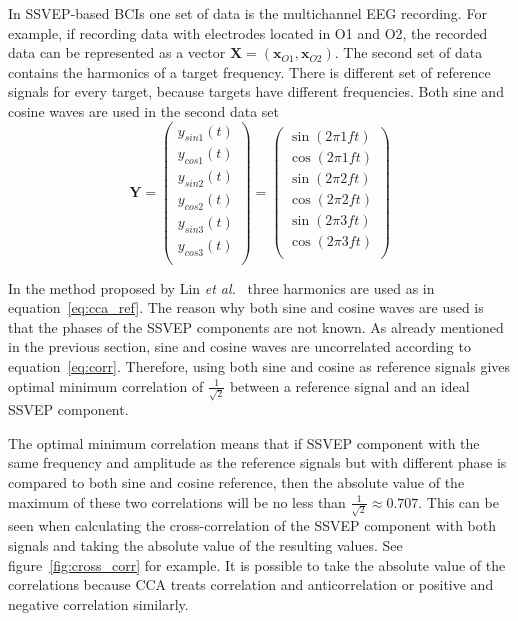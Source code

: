 In \gls{SSVEP}-based \glspl{BCI} one set of data is the multichannel \gls{EEG} recording. For example, if recording data with electrodes located in O1 and O2, the recorded data can be represented as a vector $\mathbf{X}=(\mathbf{x}_{O1}, \mathbf{x}_{O2})$. The second set of data contains the \glspl{harmonic} of a \gls{target} frequency. There is different set of reference signals for every \gls{target}, because \glspl{target} have different frequencies. Both sine and cosine waves are used in the second data set
\begin{equation}
	\label{eq:cca_ref}
	\mathbf{Y}=\begin{pmatrix}
		y_{sin1}(t)\\
		y_{cos1}(t)\\
		y_{sin2}(t)\\
		y_{cos2}(t)\\
		y_{sin3}(t)\\
		y_{cos3}(t)\\
	\end{pmatrix}=\begin{pmatrix}
		\sin(2\pi 1ft)\\
		\cos(2\pi 1ft)\\
		\sin(2\pi 2ft)\\
		\cos(2\pi 2ft)\\
		\sin(2\pi 3ft)\\
		\cos(2\pi 3ft)\\
	\end{pmatrix}
\end{equation}

In the method proposed by Lin \textit{et al.}~\cite{cca_lin} three harmonics are used as in equation~\ref{eq:cca_ref}. The reason why both sine and cosine waves are used is that the phases of the \gls{SSVEP} components are not known. As already mentioned in the previous section, sine and cosine waves are uncorrelated according to equation~\ref{eq:corr}. Therefore, using both sine and cosine as reference signals gives optimal minimum correlation of $\frac{1}{\sqrt{2}}$ between a reference signal and an ideal \gls{SSVEP} component.

The optimal minimum correlation means that if \gls{SSVEP} component with the same frequency and amplitude as the reference signals but with different phase is compared to both sine and cosine reference, then the absolute value of the maximum of these two correlations will be no less than $\frac{1}{\sqrt{2}}\approx 0.707$. This can be seen when calculating the cross-correlation of the \gls{SSVEP} component with both signals and taking the absolute value of the resulting values. See figure~\ref{fig:cross_corr} for example. It is possible to take the absolute value of the correlations because \gls{CCA} treats correlation and anticorrelation or positive and negative correlation similarly.

